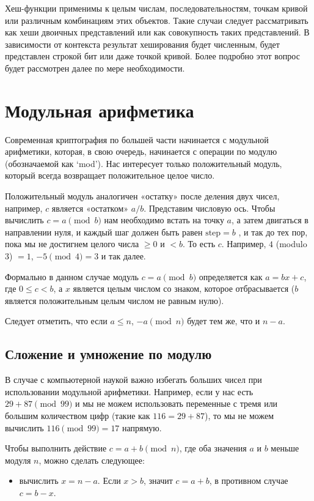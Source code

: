 Хеш-функции применимы к целым числам, последовательностям, точкам кривой или различ\-ным комбинациям этих объектов. Такие случаи следует рассматривать как хеши двоичных представлений или как совокупность таких представлений. В зависимости от контекста результат хеширования будет численным, будет представлен строкой бит или даже точкой кривой. Более подробно этот вопрос будет рассмотрен далее по мере необходимости.



\section{Модульная арифметика}
\label{sec:modular-arithmetic}

Современная криптография по большей части начинается с модульной арифметики, которая, в свою очередь, начинается с операции по модулю (обозначаемой как `mod'). Нас интересует только положительный модуль, который всегда возвращает положительное целое число.

Положительный модуль аналогичен «остатку» после деления двух чисел, например, $c$ являет\-ся «остатком» $a/b$. Представим числовую ось. Чтобы вычислить $c = a \pmod b$ нам необходи\-мо встать на точку $a$, а затем двигаться в направлении нуля, и каждый шаг должен быть равен $\text{step} = b$ , и так до тех пор, пока мы не достигнем целого числа $\geq{0}$ и $<b$. То есть $c$. Например, $4$ (modulo 3) $= 1$, $-5 \pmod 4 = 3$ и так далее.

Формально в данном случае модуль $c = a \pmod b$ определяется как $a=bx+c$, где $0\leq{c}<{b}$, а $x$ является целым числом со знаком, которое отбрасывается ($b$ является положительным целым числом не равным нулю).

Следует отметить, что если $a \leq n$, $-a \pmod n$ будет тем же, что и $n - a$.


\subsection{Сложение и умножение по модулю}
\label{subsec:modular-addition-multiplication}

В случае с компьютерной наукой важно избегать больших чисел при использовании модульной арифметики. Например, если у нас есть $29+87 \pmod{99}$ и мы не можем использовать переменные с тремя или большим количеством цифр (такие как $116 = 29+87$), то мы не можем вычислить $116 \pmod{99} = 17$ напрямую.

Чтобы выполнить действие $c = a+b \pmod n$, где оба значения $a$ и $b$ меньше модуля $n$, можно сделать следующее:
\begin{itemize}
	\item вычислить $x = n-a$. Если $x > b$, значит $c = a+b$, в противном случае $c = b - x$.
\end{itemize}

